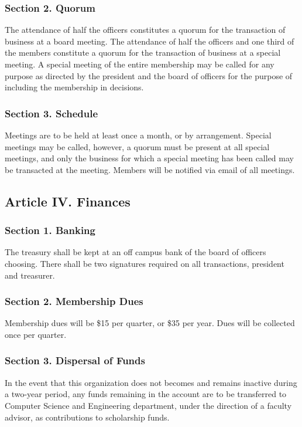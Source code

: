 \documentclass{article}
\begin{document}
    \subsubsection{Section 2. Quorum}
      The attendance of half the officers constitutes a quorum for the transaction of business at a board meeting. The attendance of half the officers and one third of the members constitute a quorum for the transaction of business at a special meeting. A special meeting of the entire membership may be called for any purpose as directed by the president and the board of officers for the purpose of including the membership in decisions.

    \subsubsection{Section 3. Schedule}
      Meetings are to be held at least once a month, or by arrangement. Special meetings may be called, however, a quorum must be present at all special meetings, and only the business for which a special meeting has been called may be transacted at the meeting. Members will be notified via email of all meetings.

  \subsection{Article IV. Finances}

    \subsubsection{Section 1. Banking}
      The treasury shall be kept at an off campus bank of the board of officers choosing. There shall be two signatures required on all transactions, president and treasurer.

    \subsubsection{Section 2. Membership Dues}
      Membership dues will be \$15 per quarter, or \$35 per year. Dues will be collected once per quarter.

    \subsubsection{Section 3. Dispersal of Funds}
      In the event that this organization does not becomes and remains inactive during a two-year period, any funds remaining in the account are to be transferred to Computer Science and Engineering department, under the direction of a faculty advisor, as contributions to scholarship funds.
\end{document}
